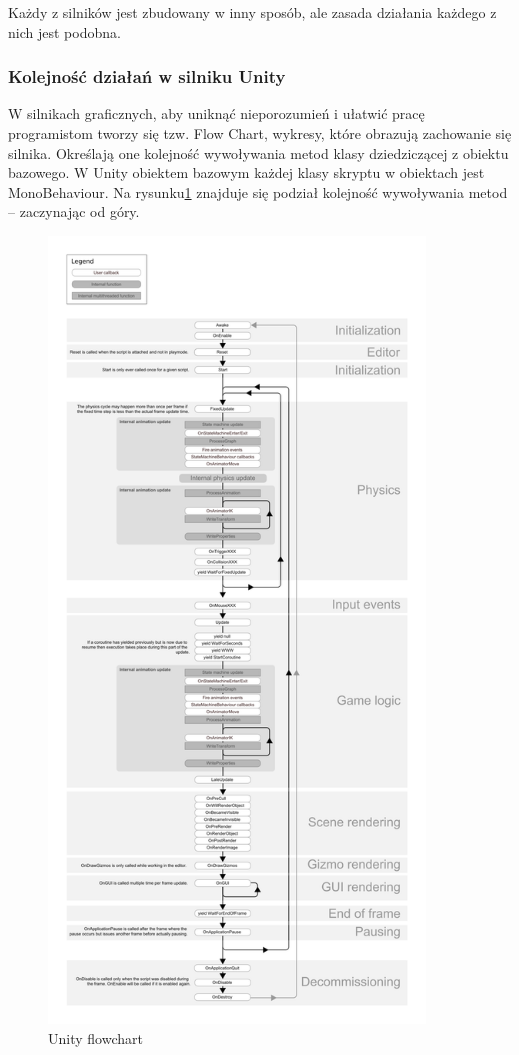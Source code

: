 \documentclass[12pt,twoside]{article}
\begin{document}
Każdy z silników jest zbudowany w inny sposób, ale zasada działania każdego z
nich jest podobna.

\subsubsection{Kolejność działań w silniku Unity}

W silnikach graficznych, aby uniknąć nieporozumień i ułatwić pracę programistom
tworzy się tzw. Flow Chart, wykresy, które obrazują zachowanie się silnika.
Określają one kolejność wywoływania metod klasy dziedziczącej z obiektu
bazowego. W Unity obiektem bazowym każdej klasy skryptu w obiektach jest
MonoBehaviour. Na rysunku\ref{Fig:UnityFlowChart} znajduje się podział kolejność
wywoływania metod -- zaczynając od góry. 
\begin{figure}[hb!]
	\centering
	\includegraphics[width=10cm]{Charts/monobehaviour_flowchart.jpg}
	\caption{Unity flowchart}
    \label{Fig:UnityFlowChart}
\end{figure}
\end{document}
